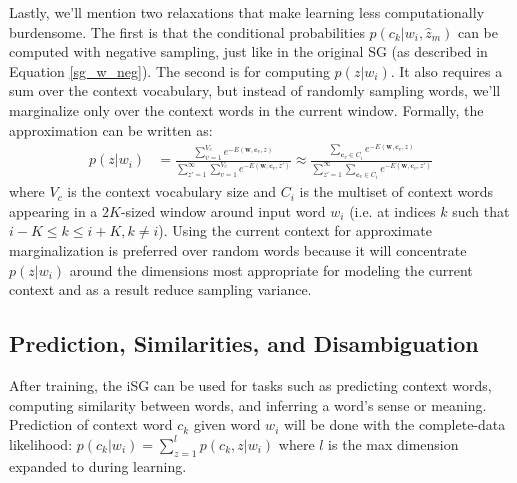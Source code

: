 \documentclass{article} %
\begin{document}
Lastly, we'll mention two relaxations that make learning less computationally burdensome.  The first is that the conditional probabilities $p(c_k | w_i , \hat{z}_{m})$ can be computed with negative sampling, just like in the original SG (as described in Equation \ref{sg_w_neg}).  The second is for computing $p(z | w_i)$.  It also requires a sum over the context vocabulary, but instead of randomly sampling words, we'll marginalize only over the context words in the current window.  Formally, the approximation can be written as: \begin{equation}\begin{split}\label{z_approx}
p(z | w_{i}) &= \frac{\sum_{v=1}^{V_{c}} e^{-E(\mathbf{w}, \mathbf{c}_{v}, z)}}{\sum_{z' = 1}^{\infty} \sum_{v=1}^{V_{c}} e^{-E(\mathbf{w}, \mathbf{c}_{v}, z')}} \approx \frac{\sum_{\mathbf{c}_{v} \in C_{i}} e^{-E(\mathbf{w}, \mathbf{c}_{v}, z)}}{\sum_{z' = 1}^{\infty} \sum_{\mathbf{c}_{v} \in C_{i}} e^{-E(\mathbf{w}, \mathbf{c}_{v}, z')}}
\end{split}
\end{equation} where $V_{c}$ is the context vocabulary size and $C_{i}$ is the multiset of context words appearing in a $2K$-sized window around input word $w_{i}$ (i.e. at indices $k$ such that $i-K\le k \le i+K, k\ne i$).  Using the current context for approximate marginalization is preferred over random words because it will concentrate $p(z|w_{i})$ around the dimensions most appropriate for modeling the current context and as a result reduce sampling variance.    
\subsection{Prediction, Similarities, and Disambiguation}
After training, the iSG can be used for tasks such as predicting context words, computing similarity between words, and inferring a word's sense or meaning.  Prediction of context word $c_k$ given word $w_i$ will be done with the complete-data likelihood: $p(c_{k} | w_{i}) = \sum_{z=1}^{l} p(c_{k}, z | w_i )$ where $l$ is the max dimension expanded to during learning.  
\end{document}
